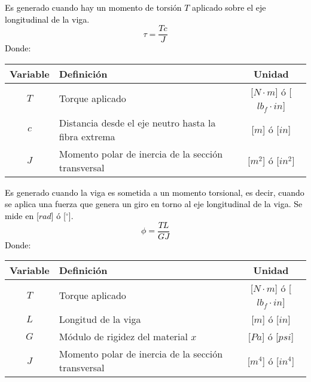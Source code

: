 \documentclass[letterpaper,11pt]{extarticle}
\newcommand{\mybox}[2]
{
    \begin{tcolorbox}[colback=color!5!white,colframe=color!75!black,boxsep=1pt,arc=0pt,outer arc=0pt,title={\textcolor{white}{#1}}]
        \textcolor{black}{#2}
    \end{tcolorbox}
}
\begin{document}
\begin{multicols}{2}
        \mybox{Esfuerzo cortante por torsión:}
        {
            Es generado cuando hay un momento de torsión $T$ aplicado sobre el eje longitudinal de la viga.
            \begin{equation}
                \tau = \frac{Tc}{J}
            \end{equation}
            Donde:
            \begin{center}
                \begin{tabular}{ c | p{25mm} | c }
                    \hline Variable & Definición & Unidad \\ \hline 
                    $T$ & Torque aplicado & [$N \cdot m$] ó [$lb_f \cdot in$]\\
                    $c$ & Distancia desde el eje neutro hasta la fibra extrema & [$m$] ó [$in$]\\
                    $J$ & Momento polar de inercia de la sección transversal & [$m^2$] ó [$in^2$]\\ \hline
                \end{tabular}
            \end{center}
        }

        \mybox{Deformacion por torsion:}
        {
            Es generado cuando la viga es sometida a un momento torsional, es decir, cuando se aplica una fuerza que genera un giro en torno al eje longitudinal de la viga. Se mide en [$rad$] ó [$^\circ$].
            \begin{equation}
                \phi = \frac{TL}{GJ}
            \end{equation}
            Donde:
            \begin{center}
                \begin{tabular}{ c | p{25mm} | c }
                    \hline Variable & Definición & Unidad \\ \hline 
                    $T$ & Torque aplicado & [$N \cdot m$] ó [$lb_f \cdot in$]\\
                    $L$ & Longitud de la viga & [$m$] ó [$in$]\\
                    $G$ & Módulo de rigidez del material $x$ & [$Pa$] ó [$psi$]\\
                    $J$ & Momento polar de inercia de la sección transversal & [$m^4$] ó [$in^4$]\\ \hline
                \end{tabular}
            \end{center}
        }
    \end{multicols}
\end{document}
